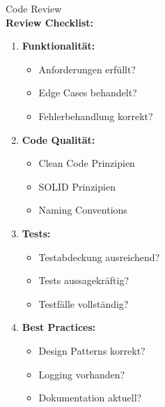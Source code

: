 \begin{KR}{Code Review}\\
\textbf{Review Checklist:}
\begin{enumerate}
    \item \textbf{Funktionalität:}
    \begin{itemize}
        \item Anforderungen erfüllt?
        \item Edge Cases behandelt?
        \item Fehlerbehandlung korrekt?
    \end{itemize}
    
    \item \textbf{Code Qualität:}
    \begin{itemize}
        \item Clean Code Prinzipien
        \item SOLID Prinzipien
        \item Naming Conventions
    \end{itemize}
    
    \item \textbf{Tests:}
    \begin{itemize}
        \item Testabdeckung ausreichend?
        \item Tests aussagekräftig?
        \item Testfälle vollständig?
    \end{itemize}
    
    \item \textbf{Best Practices:}
    \begin{itemize}
        \item Design Patterns korrekt?
        \item Logging vorhanden?
        \item Dokumentation aktuell?
    \end{itemize}
\end{enumerate}
\end{KR}

